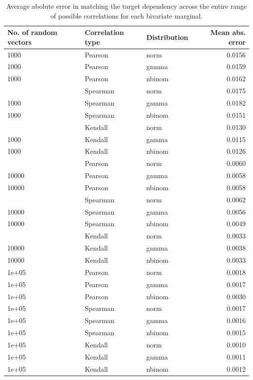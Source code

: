 \documentclass[
]{jss}
\begin{document}
\begin{CodeChunk}
\begin{table}

\caption{\label{tab:ch040-BiError}Average abolute error in matching the target dependency across the entire range of possible correlations for each bivariate marginal.}
\centering
\begin{tabular}[t]{lllr}
\toprule
No. of random vectors & Correlation type & Distribution & Mean abs. error\\
\midrule
1000 & Pearson & norm & 0.0156\\
1000 & Pearson & gamma & 0.0159\\
1000 & Pearson & nbinom & 0.0162\\
\addlinespace
1000 & Spearman & norm & 0.0175\\
1000 & Spearman & gamma & 0.0182\\
1000 & Spearman & nbinom & 0.0151\\
\addlinespace
1000 & Kendall & norm & 0.0130\\
1000 & Kendall & gamma & 0.0115\\
1000 & Kendall & nbinom & 0.0126\\
\addlinespace
10000 & Pearson & norm & 0.0060\\
10000 & Pearson & gamma & 0.0058\\
10000 & Pearson & nbinom & 0.0058\\
\addlinespace
10000 & Spearman & norm & 0.0062\\
10000 & Spearman & gamma & 0.0056\\
10000 & Spearman & nbinom & 0.0049\\
\addlinespace
10000 & Kendall & norm & 0.0033\\
10000 & Kendall & gamma & 0.0038\\
10000 & Kendall & nbinom & 0.0033\\
\addlinespace
1e+05 & Pearson & norm & 0.0018\\
1e+05 & Pearson & gamma & 0.0017\\
1e+05 & Pearson & nbinom & 0.0030\\
\addlinespace
1e+05 & Spearman & norm & 0.0017\\
1e+05 & Spearman & gamma & 0.0016\\
1e+05 & Spearman & nbinom & 0.0015\\
\addlinespace
1e+05 & Kendall & norm & 0.0010\\
1e+05 & Kendall & gamma & 0.0011\\
1e+05 & Kendall & nbinom & 0.0012\\
\bottomrule
\end{tabular}
\end{table}

\end{CodeChunk}
\end{document}
